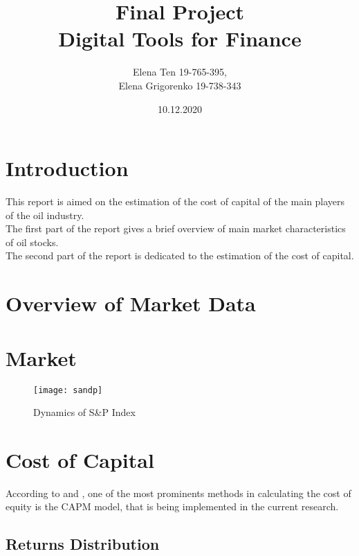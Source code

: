 \documentclass [a4paper, 11pt] {article}
\begin{document}
\title {\Huge Final Project \\
 \Huge Digital Tools for Finance }
\author {\huge Elena Ten 19-765-395, \\
	 	 \huge Elena Grigorenko 19-738-343}

\date {\huge 10.12.2020}



\maketitle
\thispagestyle{empty}

\newpage

\tableofcontents

\newpage

\section {Introduction}
This report is aimed on the estimation of the cost of capital of the main players of the oil industry.\\
The first part of the report gives a brief overview of main market characteristics of oil stocks.\\
The second part of the report is dedicated to the estimation of the cost of capital.

\section {Overview of Market Data}

\section{Market}
\begin{figure}[h]
\caption{Dynamics of S\&P Index}
\texttt{[image: sandp]}
\label{fig:sandp}
\end{figure}


\clearpage
\section {Cost of Capital}
According to \cite{DamodaranDark} and \cite{BestPract}, one of the most prominents methods in calculating the cost of equity is the CAPM model, that is being implemented in the current research.

\subsection {Returns Distribution}
\end{document}

